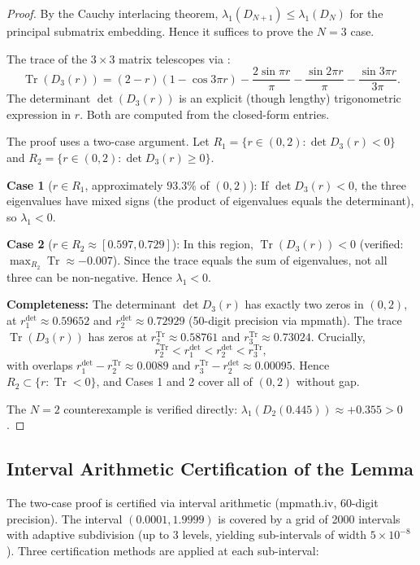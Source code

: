 \documentclass[12pt,a4paper]{article}
\theoremstyle{definition}
\theoremstyle{remark}
\begin{document}
\begin{proof}
By the Cauchy interlacing theorem, $\lambda_1(D_{N+1}) \leq \lambda_1(D_N)$ for the principal submatrix embedding. Hence it suffices to prove the $N = 3$ case.

The trace of the $3 \times 3$ matrix telescopes via :
\[
  \operatorname{Tr}(D_3(r)) = (2-r)(1 - \cos 3\pi r) - \frac{2\sin\pi r}{\pi} - \frac{\sin 2\pi r}{\pi} - \frac{\sin 3\pi r}{3\pi}.
\]
The determinant $\det(D_3(r))$ is an explicit (though lengthy) trigonometric expression in $r$. Both are computed from the closed-form entries.

The proof uses a two-case argument. Let $R_1 = \{r \in (0,2) : \det D_3(r) < 0\}$ and $R_2 = \{r \in (0,2) : \det D_3(r) \geq 0\}$.

\medskip
\noindent\textbf{Case 1} ($r \in R_1$, approximately $93.3\%$ of $(0,2)$):
If $\det D_3(r) < 0$, the three eigenvalues have mixed signs (the product of eigenvalues equals the determinant), so $\lambda_1 < 0$.

\medskip
\noindent\textbf{Case 2} ($r \in R_2 \approx [0.597, 0.729]$):
In this region, $\operatorname{Tr}(D_3(r)) < 0$ (verified: $\max_{R_2}\operatorname{Tr} \approx -0.007$). Since the trace equals the sum of eigenvalues, not all three can be non-negative. Hence $\lambda_1 < 0$.

\medskip
\noindent\textbf{Completeness:}
The determinant $\det D_3(r)$ has exactly two zeros in $(0,2)$, at $r_1^{\det} \approx 0.59652$ and $r_2^{\det} \approx 0.72929$ (50-digit precision via mpmath). The trace $\operatorname{Tr}(D_3(r))$ has zeros at $r_2^{\operatorname{Tr}} \approx 0.58761$ and $r_3^{\operatorname{Tr}} \approx 0.73024$. Crucially,
\[
  r_2^{\operatorname{Tr}} < r_1^{\det} < r_2^{\det} < r_3^{\operatorname{Tr}},
\]
with overlaps $r_1^{\det} - r_2^{\operatorname{Tr}} \approx 0.0089$ and $r_3^{\operatorname{Tr}} - r_2^{\det} \approx 0.00095$.
Hence $R_2 \subset \{r : \operatorname{Tr} < 0\}$, and Cases 1 and 2 cover all of $(0,2)$ without gap.

The $N = 2$ counterexample is verified directly: $\lambda_1(D_2(0.445)) \approx +0.355 > 0$.
\end{proof}

\subsection{Interval Arithmetic Certification of the Lemma}

The two-case proof is certified via interval arithmetic (mpmath.iv, 60-digit precision). The interval $(0.0001, 1.9999)$ is covered by a grid of 2000 intervals with adaptive subdivision (up to 3 levels, yielding sub-intervals of width $5 \times 10^{-8}$). Three certification methods are applied at each sub-interval:
\end{document}
